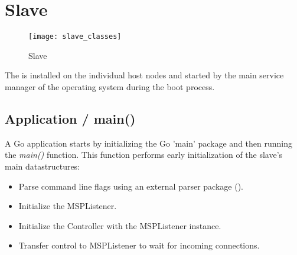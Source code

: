 \section{Slave}

\begin{figure}[H]
	\texttt{[image: slave\_classes]}
	\caption{Slave}
\end{figure}

The  is installed on the individual host nodes and started by the main service manager of the operating system during the boot process.

\subsection{Application / main()}{
  A Go application starts by initializing the Go 'main' package and then running the \textit{main()} function.
  This function performs early initialization of the slave's main datastructures:
  \begin{itemize}
    \item Parse command line flags using an external parser package ().
    \item Initialize the MSPListener.
    \item Initialize the Controller with the MSPListener instance.
    \item Transfer control to MSPListener to wait for incoming connections.
  \end{itemize}
}


